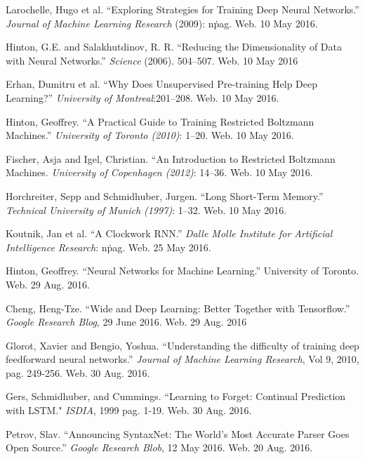 \documentclass{article}
\begin{document}
\begin{thebibliography}{9}
		Larochelle, Hugo et al. ``Exploring Strategies for Training Deep Neural
		Networks.'' \textit{Journal of Machine Learning Research} (2009): n\. pag.
		Web. 10 May 2016.

		Hinton, G.E. and Salakhutdinov, R. R. ``Reducing the Dimensionality of
		Data with Neural Networks.'' \textit{Science} (2006). 504--507. Web. 10
		May 2016

		Erhan, Dumitru et al. ``Why Does Unsupervised Pre-training Help Deep
		Learning?'' \textit{University of Montreal}:201--208. Web. 10 May 2016.

		Hinton, Geoffrey. ``A Practical Guide to Training Restricted Boltzmann
		Machines.'' \textit{University of Toronto (2010)}: 1--20. Web. 10 May
		2016.

		Fischer, Asja and Igel, Christian. ``An Introduction to Restricted
		Boltzmann Machines. \textit{University of Copenhagen (2012)}: 14--36. Web.
		10 May 2016.

		Horchreiter, Sepp and Schmidhuber, Jurgen. ``Long Short-Term Memory.''
		\textit{Technical University of Munich (1997)}: 1--32. Web. 10 May 2016.

		Koutnik, Jan et al. ``A Clockwork RNN.'' \textit{Dalle Molle Institute
		for Artificial Intelligence Research}: n\. pag. Web. 25 May 2016.

		Hinton, Geoffrey. ``Neural Networks for Machine Learning.'' University
		of Toronto. Web. 29 Aug. 2016.

		Cheng, Heng-Tze. ``Wide and Deep Learning: Better Together with
		Tensorflow.'' \textit{Google Research Blog}, 29 June 2016. Web. 29 Aug.
		2016

		Glorot, Xavier and Bengio, Yoshua. ``Understanding the difficulty of
		training deep feedforward neural networks.'' \textit{Journal of Machine
		Learning Research}, Vol 9, 2010, pag. 249-256. Web. 30 Aug. 2016.

		Gers, Schmidhuber, and Cummings. ``Learning to Forget: Continual
		Prediction with LSTM." \textit{ISDIA}, 1999 pag. 1-19. Web. 30 Aug.
		2016.

		Petrov, Slav. ``Announcing SyntaxNet: The World's Most Accurate Parser
		Goes Open Source.'' \textit{Google Research Blob}, 12 May 2016. Web. 20
		Aug. 2016.


\end{thebibliography}
\end{document}
